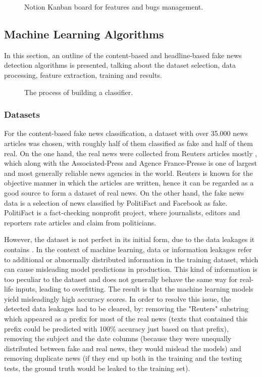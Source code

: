 \begin{figure}[H]
  \centering
  \caption{Notion Kanban board for features and bugs management.}
\end{figure}

\subsection{Machine Learning Algorithms}
In this section, an outline of the content-based and headline-based fake news detection algorithms is presented, talking about the dataset selection, data processing, feature extraction, training and results.

\begin{figure}[H]
  \centering
  \caption{The process of building a classifier.}
\end{figure}

\subsubsection{Datasets}
For the content-based fake news classification, a dataset \cite{dataset_content} with over 35.000 news articles was chosen, with roughly half of them classified as fake and half of them real. On the one hand, the real news were collected from Reuters articles mostly \cite{a1}, which along with the Associated-Press and Agence France-Presse is one of largest and most generally reliable news agencies in the world. Reuters is known for the objective manner in which the articles are written, hence it can be regarded as a good source to form a dataset of real news. On the other hand, the fake news data is a selection of news classified by PolitiFact and Facebook as fake. PolitiFact is a fact-checking nonprofit project, where journalists, editors and reporters rate articles and claim from politicians. 

However, the dataset is not perfect in its initial form, due to the data leakages it contains \cite{data_leaks}. In the context of machine learning, data or information leakages refer to additional or abnormally distributed information in the training dataset, which can cause misleading model predictions in production. This kind of information is too peculiar to the dataset and does not generally behave the same way for real-life inputs, leading to overfitting. The result is that the machine learning models yield misleadingly high accuracy scores. In order to resolve this issue, the detected data leakages had to be cleared, by: removing the "Reuters" substring which appeared as a prefix for most of the real news (texts that contained this prefix could be predicted with 100\% accuracy just based on that prefix), removing the subject and the date columns (because they were unequally distributed between fake and real news, they would mislead the models) and removing duplicate news (if they end up both in the training and the testing tests, the ground truth would be leaked to the training set).

